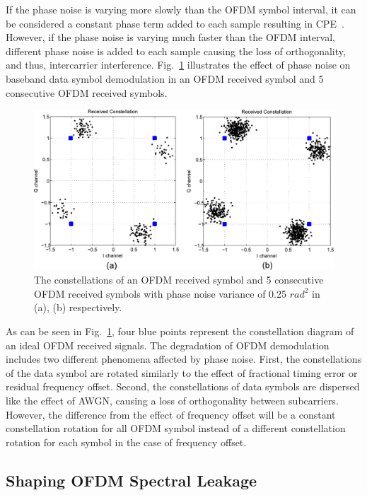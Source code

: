 If the phase noise is varying more slowly than the OFDM symbol interval, it can be considered a constant phase term added to each sample resulting in CPE~\cite{Armada1998}.
However, if the phase noise is varying much faster than the OFDM interval, different phase noise is added to each sample causing the loss of orthogonality, and thus, intercarrier interference.
Fig.~\ref{fig:phasenoise} illustrates the effect of phase noise on baseband data symbol demodulation in an OFDM received symbol and 5 consecutive OFDM received symbols.
\begin{figure}
	\centerline{\includegraphics [width=0.8\columnwidth] {Figures/phasenoise.pdf} }
	\caption{The constellations of an OFDM received symbol and 5 consecutive OFDM received symbols with phase noise variance of 0.25 $rad^2$ in (a), (b) respectively.}
	\label{fig:phasenoise}
\end{figure}

As can be seen in Fig.~\ref{fig:phasenoise}, four blue points represent the constellation diagram of an ideal OFDM received signals.
The degradation of OFDM demodulation includes two different phenomena affected by phase noise.
First, the constellations of the data symbol are rotated similarly to the effect of fractional timing error or residual frequency offset.
Second, the constellations of data symbols are dispersed like the effect of AWGN, causing a loss of orthogonality between subcarriers.
However, the difference from the effect of frequency offset will be a constant constellation rotation for all OFDM symbol instead of a different constellation rotation for each symbol in the case of frequency offset.


\subsection{Shaping OFDM Spectral Leakage}
\label{Ch2:SpecLeak}

